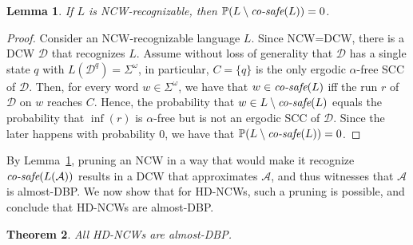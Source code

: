 \documentclass[10pt,a4paper]{amsart}
\newtheorem{thm}{Theorem}[section]
\newtheorem{lem}[thm]{Lemma}
\theoremstyle{definition}
\numberwithin{equation}{section}
\newcommand{\A}{{\mathcal A}}
\newcommand{\D}{{\mathcal D}}
\renewcommand{\P}{\mathbb{P}}
\newcommand{\cs}{\mbox{\it co-safe}}
\begin{document}
\begin{lem}\label{good prefix is 1-apprx of NCW}	If $L$ is NCW-recognizable, then $\P(L\setminus \cs(L))=0$.
\end{lem}

\begin{proof}
Consider an NCW-recognizable language $L$. Since NCW=DCW, there is a DCW $\D$ that recognizes $L$. Assume without loss of generality that $\D$ has a single state $q$ with $L(\D^q) = \Sigma^\omega$, in particular, $C = \{q\}$ is the only ergodic $\alpha$-free SCC of $\D$. Then, for every word $w \in \Sigma^\omega$, we have that $w \in \cs(L)$ iff the run $r$ of $\D$ on $w$ reaches $C$. Hence, the probability that $w \in L\setminus \cs(L)$ equals the probability that $\inf(r)$ is $\alpha$-free but is not an ergodic SCC of $\D$. Since the later happens with probability 0, we have that  $\P(L\setminus \cs(L))=0$.
\end{proof}


By Lemma~\ref{good prefix is 1-apprx of NCW}, pruning an NCW in a way that would make it recognize $\cs(L(\A))$ results in a DCW that approximates $\A$, and thus witnesses that $\A$ is almost-DBP. We now show that for HD-NCWs, such a pruning is possible, and conclude that HD-NCWs are almost-DBP. 


\begin{thm}\label{HD-ncw almost}All HD-NCWs are almost-DBP.\end{thm}
\end{document}
